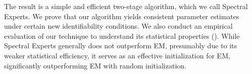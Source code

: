 






The result is a simple and efficient two-stage algorithm,
which we call Spectral Experts.
We prove that our algorithm yields consistent parameter estimates under certain
new identifiability conditions.  We also conduct an empirical evaluation
of our technique to understand its statistical properties ().
While Spectral Experts generally does not outperform EM, presumably due to its
weaker statistical efficiency, it serves as an effective initialization for EM,
significantly outperforming EM with random initialization.

